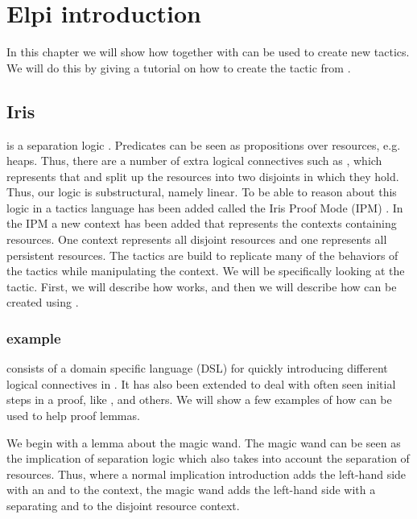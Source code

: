 \documentclass[thesis.tex]{subfiles}
\begin{document}
\chapter{Elpi introduction}
In this chapter we will show how \elpi together with \ce can be used to create new tactics. We will do this by giving a tutorial on how to create the  tactic from \iris.

\section[Iris iIntros]{Iris }
\iris is a separation logic \cite*{jungIrisMonoidsInvariants2015a,jungHigherorderGhostState2016,krebbersEssenceHigherOrderConcurrent2017,jungIrisGroundModular2018}. Predicates can be seen as propositions over resources, e.g. heaps. Thus, there are a number of extra logical connectives such as , which represents that  and  split up the resources into two disjoints in which they hold. Thus, our logic is substructural, namely linear. To be able to reason about this logic in \coq a tactics language has been added called the Iris Proof Mode (IPM) \cite*{krebbersInteractiveProofsHigherorder2017,krebbersMoSeLGeneralExtensible2018}. In the IPM a new context has been added that represents the contexts containing resources. One context represents all disjoint resources and one represents all persistent resources. The tactics are build to replicate many of the behaviors of the \coq tactics while manipulating the \iris context. We will be specifically looking at the  tactic. First, we will describe how  works, and then we will describe how  can be created using \elpi.

\subsection[iIntros example]{ example}
 consists of a domain specific language (DSL) for quickly introducing different logical connectives in \iris. It has also been extended to deal with often seen initial steps in a proof, like ,  and others. We will show a few examples of how  can be used to help proof lemmas.

We begin with a lemma about the magic wand. The magic wand can be seen as the implication of separation logic which also takes into account the separation of resources. Thus, where a normal implication introduction adds the left-hand side with an and to the context, the magic wand adds the left-hand side with a separating and to the disjoint resource context.
\end{document}
